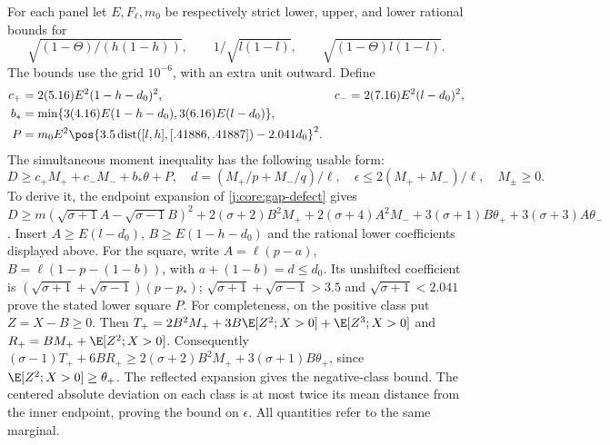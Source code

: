 For each panel let $E,F_\ell,m_0$ be respectively strict lower, upper,
and lower rational bounds for
\[
 \sqrt{(1-\Theta)/(h(1-h))},\qquad
 1/\sqrt{l(1-l)},\qquad \sqrt{(1-\Theta)l(1-l)}.
\]
The bounds use the grid $10^{-6}$, with an extra unit outward. Define
\begin{align*}
 c_+&=2(5.16)E^2(1-h-d_0)^2,&
 c_-&=2(7.16)E^2(l-d_0)^2,\\
 b_*&=\min\{3(4.16)E(1-h-d_0),3(6.16)E(l-d_0)\},\\
 P&=m_0E^2\pos{3.5\operatorname{dist}([l,h],[.41886,.41887])-2.041d_0}^2.
\end{align*}
The simultaneous moment inequality has the following usable form:
\begin{equation}\label{j:local:conf:moment}
 D\ge c_+M_++c_-M_-+b_*\theta+P,\quad
 d=(M_+/p+M_-/q)/\ell,\quad
 \epsilon\le2(M_++M_-)/\ell,\quad M_\pm\ge0.
\end{equation}
To derive it, the endpoint expansion of \eqref{j:core:gap-defect} gives
$D\ge m(\sqrt{\sigma+1}A-\sqrt{\sigma-1}B)^2
+2(\sigma+2)B^2M_++2(\sigma+4)A^2M_-
+3(\sigma+1)B\theta_++3(\sigma+3)A\theta_-$.
Insert $A\ge E(l-d_0)$, $B\ge E(1-h-d_0)$ and the rational lower
coefficients displayed above. For the square, write
$A=\ell(p-a)$, $B=\ell(1-p-(1-b))$, with
$a+(1-b)=d\le d_0$. Its unshifted coefficient is
$(\sqrt{\sigma+1}+\sqrt{\sigma-1})(p-p_*)$;
$\sqrt{\sigma+1}+\sqrt{\sigma-1}>3.5$ and
$\sqrt{\sigma+1}<2.041$ prove the stated lower square $P$.
For completeness, on the positive class put $Z=X-B\ge0$.
Then $T_+=2B^2M_++3B\E[Z^2;X>0]+\E[Z^3;X>0]$ and
$R_+=BM_++\E[Z^2;X>0]$. Consequently
$(\sigma-1)T_++6BR_+\ge2(\sigma+2)B^2M_+
+3(\sigma+1)B\theta_+$, since $\E[Z^2;X>0]\ge\theta_+$.
The reflected expansion gives the negative-class bound.
The centered absolute deviation on each class is at most twice its
mean distance from the inner endpoint, proving the bound on $\epsilon$.
All quantities refer to the same marginal.

